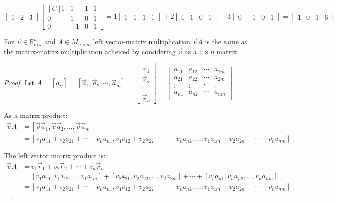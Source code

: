 \begin{example}
$$
\begin{bmatrix}1 & 2 & 3 \end{bmatrix} \begin{bmatrix*}[C] 1 & 1 & 1 & 1 \\ 0 & 1 & 0 & 1 \\ 0 & -1 & 0 & 1 \end{bmatrix*}
=1 \begin{bmatrix}1 & 1 & 1 & 1\end{bmatrix}+2\begin{bmatrix}0 & 1 & 0 & 1\end{bmatrix}+3\begin{bmatrix}0 & -1 & 0 & 1 \end{bmatrix}
=\begin{bmatrix} 1 & 0 & 1 & 6 \end{bmatrix}
$$
%
\end{example}

\begin{proposition}
For $\vec{v} \in \mathbb{R}^n_\text{row}$ and $A \in M_{n \times m}$ left vector-matrix multiplication $\vec{v}A$ is the same as the matrix-matrix multiplication 
acheiced by considering $\vec{v}$ as a $1 \times n$ matrix.
\end{proposition}
\begin{proof}
Let $A=[a_{ij}]=[\vec{a}_1, \vec{a}_2, \cdots, \vec{a}_m]=
\begin{bmatrix}
\vec{r}_1\\
\vec{r}_2\\
\vdots \\ 
\vec{r}_n
\end{bmatrix}=
\begin{bmatrix}
a_{11} & a_{12} & \cdots & a_{1m}\\
a_{21} & a_{22} & \cdots & a_{2m}\\
\vdots & \vdots & \ddots & \vdots\\
a_{n1} & a_{n2} & \cdots & a_{nm}\\
\end{bmatrix}
$.

As a matrix product:
\begin{align*}
\vec{v}A&=[\vec{v}\vec{a}_1, \vec{v}\vec{a}_2, \ldots, \vec{v}\vec{a}_m]\\
&=[v_1a_{11}+v_2a_{21}+\cdots+v_na_{n1}, v_1a_{12}+v_2a_{22}+\cdots+v_na_{n2}, \ldots, v_1a_{1m}+v_2a_{2m}+\cdots+v_na_{nm}]
\end{align*}

The left vector matrix product is:
\begin{align*}
\vec{v}A &=v_1\vec{r}_1+v_2\vec{r}_2+\cdots+v_n\vec{r}_n\\
&=[v_1a_{11}, v_1a_{12}, \ldots, v_1a_{1m}]+[v_2a_{21}, v_2a_{22}, \ldots, v_2a_{2m}]+\cdots+[v_na_{n1}, v_na_{n2}, \ldots, v_na_{nm}]\\
&=[v_1a_{11}+v_2a_{21}+\cdots+v_na_{n1}, v_1a_{12}+v_2a_{22}+\cdots+v_na_{n2}, \ldots, v_1a_{1m}+v_2a_{2m}+\cdots+v_na_{nm}]
\end{align*}
\end{proof}

